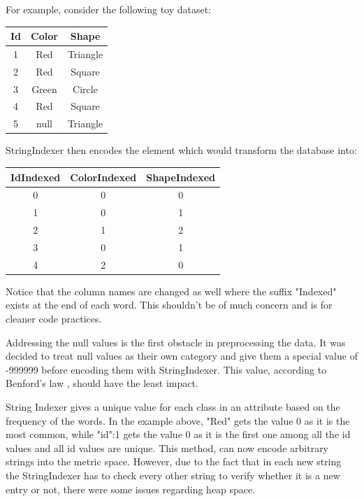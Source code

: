 \documentclass[sigconf]{acmart}
\begin{document}
For example, consider the following toy dataset: 
\begin{center}
\begin{tabular}{||c c c||} 
 \hline
 Id & Color & Shape \\ [0.5ex] 
 \hline\hline
 1 & Red& Triangle\\ 
 \hline
 2 & Red & Square\\
 \hline
 3 & Green & Circle\\
 \hline
 4 & Red & Square\\
 \hline
 5 & null & Triangle\\ [1ex] 
 \hline
\end{tabular}
\end{center}
StringIndexer then encodes the element which would transform the database into:
\begin{center}
\begin{tabular}{||c c c||} 
 \hline
 IdIndexed & ColorIndexed & ShapeIndexed \\ [0.5ex] 
 \hline\hline
 0 & 0 & 0\\ 
 \hline
 1 & 0 & 1\\
 \hline
 2 & 1 & 2\\
 \hline
 3 & 0 & 1\\
 \hline
 4 & 2 & 0\\ [1ex] 
 \hline
\end{tabular}
\end{center}

Notice that the column names are changed as well where the suffix "Indexed" exists at the end of each word. This shouldn't be of much concern and is for cleaner code practices.

Addressing the null values is the first obstacle in preprocessing the data. It was decided to treat null values as their own category and give them a special value of -999999 before encoding them with StringIndexer. This value, according to Benford's law \cite{miller2015benford}, should have the least impact.

String Indexer gives a unique value for each class in an attribute based on the frequency of the words. In the example above, "Red" gets the value 0 as it is the most common, while "id":1 gets the value 0 as it is the first one among all the id values and all id values are unique.
This method, can now encode arbitrary strings into the metric space. However, due to the fact that in each new string the StringIndexer has to check every other string to verify whether it is a new entry or not, there were some issues regarding heap space. 
\end{document}
